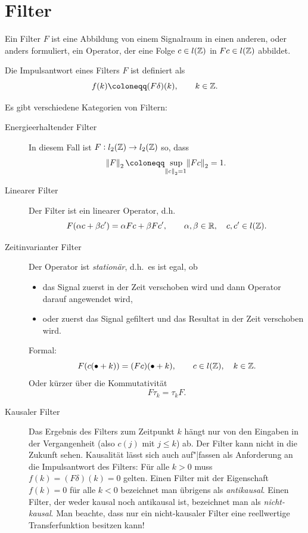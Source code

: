 \section{Filter}

\begin{definition}[Filter]
Ein Filter $ F $ ist eine Abbildung von einem Signalraum in einen anderen, oder anders formuliert, 
ein Operator, der eine Folge $ c \in l(\mathbb{Z}) $ in $ Fc \in l(\mathbb{Z}) $ abbildet.
\end{definition}

\begin{definition}[Impulsantwort]
Die Impulsantwort eines Filters $ F $ ist definiert als
\[
  f(k) \coloneqq (F \delta)(k), \qquad k \in \Z.
\]
\end{definition}

\begin{remark}[Filtertypen]
Es gibt verschiedene Kategorien von Filtern:
\begin{description}
\item [Energieerhaltender Filter]
  In diesem Fall ist $ F : l_{2}(\mathbb{Z}) \rightarrow l_{2}(\mathbb{Z}) $ so, dass
  \[
    \norm{F}_{2} \coloneqq \sup_{\norm{c}_{2} = 1} \norm{Fc}_{2} = 1.
  \]
\item [Linearer Filter]
  Der Filter ist ein linearer Operator, d.h.\
  \[
    F(\alpha c + \beta c') = \alpha Fc + \beta Fc', \qquad \alpha, \beta \in \mathbb{R}, 
                                                    \quad c, c' \in l(\mathbb{Z}).
  \]
\item [Zeitinvarianter Filter]
  Der Operator ist \emph{stationär}, d.h.\ es ist egal, ob
  \begin{itemize}
  \item das Signal zuerst in der Zeit verschoben wird und dann Operator darauf angewendet wird,
  \item oder zuerst das Signal gefiltert und das Resultat in der Zeit verschoben wird.
  \end{itemize}
  Formal:
  \[
    F(c(\bullet + k)) = (Fc)(\bullet + k), \qquad c \in l(\mathbb{Z}), \quad k \in \mathbb{Z}.
  \]
  Oder kürzer über die Kommutativität
  \[
    F\tau_{k} = \tau_{k}F.
  \]
\item [Kausaler Filter]
  Das Ergebnis des Filters zum Zeitpunkt $ k $ hängt nur von den Eingaben in der Vergangenheit
  (also $ c(j) $ mit $ j \leq k $) ab. Der Filter kann nicht in die Zukunft sehen. Kausalität
  lässt sich auch auf"|fassen als Anforderung an die Impulsantwort des Filters: Für alle $ k > 0 $
  muss $ f(k) = (F\delta)(k) = 0 $ gelten. Einen Filter mit der Eigenschaft $ f(k) = 0 $ für alle
  $ k < 0 $ bezeichnet man übrigens als \emph{antikausal}. Einen Filter, der weder kausal noch
  antikausal ist, bezeichnet man als \emph{nicht-kausal}. Man beachte, dass nur ein nicht-kausaler
  Filter eine reellwertige Transferfunktion besitzen kann!
\end{description}
\end{remark}

